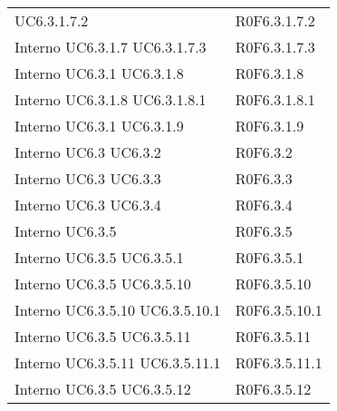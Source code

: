 \begin{longtable}{p{2.5cm}!{\VRule[1pt]}p{2.5cm}}
 \newline UC6.3.1.7.2
 & R0F6.3.1.7.2 \\
Interno \newline UC6.3.1.7
 \newline UC6.3.1.7.3
 & R0F6.3.1.7.3 \\
Interno \newline UC6.3.1
 \newline UC6.3.1.8
 & R0F6.3.1.8 \\
Interno \newline UC6.3.1.8
 \newline UC6.3.1.8.1
 & R0F6.3.1.8.1 \\
Interno \newline UC6.3.1
 \newline UC6.3.1.9
 & R0F6.3.1.9 \\
Interno \newline UC6.3
 \newline UC6.3.2
 & R0F6.3.2 \\
Interno \newline UC6.3
 \newline UC6.3.3
 & R0F6.3.3 \\
Interno \newline UC6.3
 \newline UC6.3.4
 & R0F6.3.4 \\
Interno \newline UC6.3.5
 & R0F6.3.5 \\
Interno \newline UC6.3.5
 \newline UC6.3.5.1
 & R0F6.3.5.1 \\
Interno \newline UC6.3.5
 \newline UC6.3.5.10
 & R0F6.3.5.10 \\
Interno \newline UC6.3.5.10
 \newline UC6.3.5.10.1
 & R0F6.3.5.10.1 \\
Interno \newline UC6.3.5
 \newline UC6.3.5.11
 & R0F6.3.5.11 \\
Interno \newline UC6.3.5.11
 \newline UC6.3.5.11.1
 & R0F6.3.5.11.1 \\
Interno \newline UC6.3.5
 \newline UC6.3.5.12
 & R0F6.3.5.12 \\

\end{longtable}
